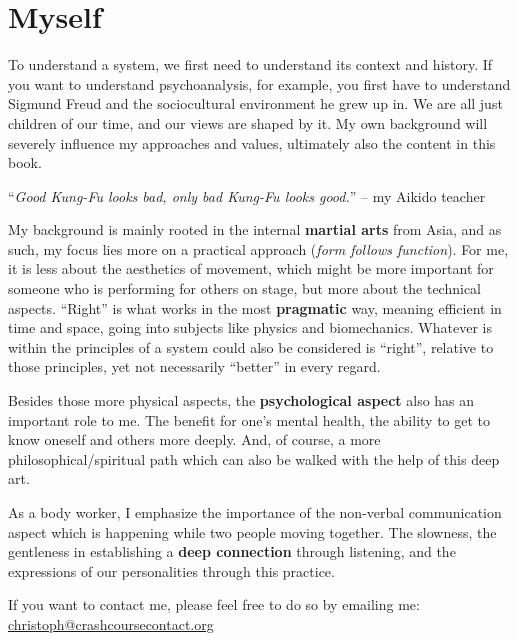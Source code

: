 \section{Myself}\label{sec:myself}

To understand a system, we first need to understand its context and history.
If you want to understand psychoanalysis, for example, you first have to understand Sigmund Freud and the sociocultural environment he grew up in.
We are all just children of our time, and our views are shaped by it.
My own background will severely influence my approaches and values, ultimately also the content in this book.

\begin{displayquote}
    ``\textit{Good Kung-Fu looks bad, only bad Kung-Fu looks good.}'' -- my Aikido teacher
\end{displayquote}

My background is mainly rooted in the internal \textbf{martial arts} from Asia, and as such, my focus lies more on a practical approach (\textit{form follows function}).
For me, it is less about the aesthetics of movement, which might be more important for someone who is performing for others on stage, but more about the technical aspects.
``Right'' is what works in the most \textbf{pragmatic} way, meaning efficient in time and space, going into subjects like physics and biomechanics.
Whatever is within the principles of a system could also be considered is ``right'', relative to those principles, yet not necessarily ``better'' in every regard.

Besides those more physical aspects, the \textbf{psychological aspect} also has an important role to me.
The benefit for one's mental health, the ability to get to know oneself and others more deeply.
And, of course, a more philosophical/spiritual path which can also be walked with the help of this deep art.

As a body worker, I emphasize the importance of the non-verbal communication aspect which is happening while two people moving together.
The slowness, the gentleness in establishing a \textbf{deep connection} through listening, and the expressions of our personalities through this practice.

If you want to contact me, please feel free to do so by emailing me: \href{mailto:christoph@crashcoursecontact.org}{christoph@crashcoursecontact.org}
